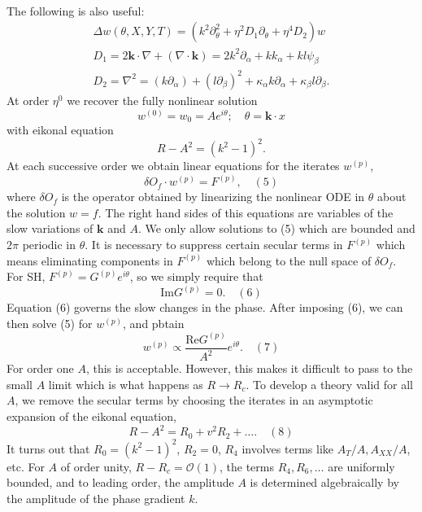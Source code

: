 \documentclass[12pt]{article}
\newcounter{solution}
\begin{document}
\begin{itemize}
\begin{align*}
        \end{align*}
        The following is also useful:
        \begin{gather*}
            \Delta w(\theta,X,Y,T) = (k^2\partial^2_{\theta}+\eta^2D_1\partial_{\theta}+\eta^4D_2)w\\
            D_1 = 2\bm{k}\cdot\nabla + (\nabla \cdot \bm{k}) = 2k^2\partial_{\alpha}+kk_{\alpha}+kl\psi_{\beta}\\
            D_2 = \nabla^2 = (k\partial_{\alpha})+(l\partial_{\beta})^2+\kappa_{\alpha}k\partial_{\alpha}+\kappa_{\beta}l\partial_{\beta}.
        \end{gather*}
        At order $\eta^0$ we recover the fully nonlinear solution
        \[
            w^{(0)} = w_0 = Ae^{i\theta}; \quad \theta=\bm{k} \cdot x
        \] 
        with eikonal equation
        \[
            R-A^2 = (k^2-1)^2.
        \] 
        At each successive order we obtain linear equations for the iterates $w^{(p)}$,
        \[
            \delta O_f \cdot w^{(p)} = F^{(p)}, \quad (5)
        \] 
        where $\delta O_f$ is the operator obtained by linearizing the nonlinear ODE in $\theta$ about the solution $w=f$. The right hand sides of this equations are variables of the slow variations of $\bm{k}$ and $A$. \newline
        We only allow solutions to (5) which are bounded and $2\pi$ periodic in $\theta$. It is necessary to suppress certain secular terms in $F^{(p)}$ which means eliminating components in $F^{(p)}$ which belong to the null space of $\delta O_f$. For SH, $F^{(p)} = G^{(p)}e^{i\theta}$, so we simply require that 
        \[
            \text{Im}G^{(p)}=0. \quad (6)
        \] 
        Equation (6) governs the slow changes in the phase. After imposing (6), we can then solve (5) for $w^{(p)}$, and pbtain
        \[
            w^{(p)} \propto \frac{\text{Re}G^{(p)}}{A^2}e^{i\theta}. \quad (7)
        \] 
        For order one $A$, this is acceptable. However, this makes it difficult to pass to the small $A$ limit which is what happens as $R \rightarrow R_c$. To develop a theory valid for all $A$, we remove the secular terms by choosing the iterates in an asymptotic expansion of the eikonal equation,
        \[
            R-A^2 = R_0+v^2R_2+\dots. \quad (8)
        \] 
        It turns out that $R_0 = (k^2-1)^2$, $R_2 = 0$, $R_4$ involves terms like $A_T/A, A_{XX}/A$, etc. For $A$ of order unity, $R-R_c = \mathcal{O}(1)$, the terms $R_4, R_6,\dots$ are uniformly bounded, and to leading order, the amplitude $A$ is determined algebraically by the amplitude of the phase gradient $k$. \newline

\end{itemize}
\end{document}
